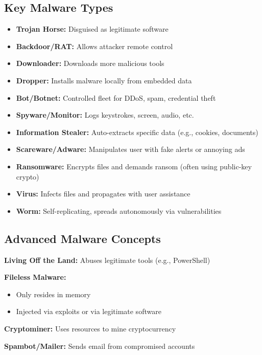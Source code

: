 \subsection{Key Malware Types}
{
\begin{itemize}[noitemsep]
  \item \textbf{Trojan Horse:} Disguised as legitimate software
  \item \textbf{Backdoor/RAT:} Allows attacker remote control
  \item \textbf{Downloader:} Downloads more malicious tools
  \item \textbf{Dropper:} Installs malware locally from embedded data
  \item \textbf{Bot/Botnet:} Controlled fleet for DDoS, spam, credential theft
  \item \textbf{Spyware/Monitor:} Logs keystrokes, screen, audio, etc.
  \item \textbf{Information Stealer:} Auto-extracts specific data (e.g., cookies, documents)
  \item \textbf{Scareware/Adware:} Manipulates user with fake alerts or annoying ads
  \item \textbf{Ransomware:} Encrypts files and demands ransom (often using public-key crypto)
  \item \textbf{Virus:} Infects files and propagates with user assistance
  \item \textbf{Worm:} Self-replicating, spreads autonomously via vulnerabilities
\end{itemize}
}

\subsection{Advanced Malware Concepts}
{
\textbf{Living Off the Land:} Abuses legitimate tools (e.g., PowerShell)

\textbf{Fileless Malware:}
\begin{itemize}[noitemsep]
  \item Only resides in memory
  \item Injected via exploits or via legitimate software
\end{itemize}

\textbf{Cryptominer:} Uses resources to mine cryptocurrency

\textbf{Spambot/Mailer:} Sends email from compromised accounts
}

